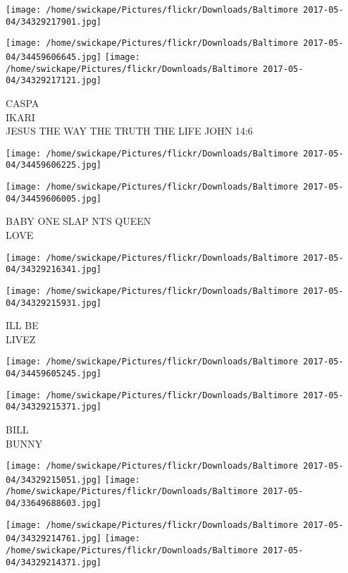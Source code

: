 \documentclass[10pt,letterpaper]{article}
\begin{document}
\texttt{[image: /home/swickape/Pictures/flickr/Downloads/Baltimore 2017-05-04/34329217901.jpg]}

\vspace{0.25in}
\texttt{[image: /home/swickape/Pictures/flickr/Downloads/Baltimore 2017-05-04/34459606645.jpg]}
\texttt{[image: /home/swickape/Pictures/flickr/Downloads/Baltimore 2017-05-04/34329217121.jpg]}

CASPA\\
IKARI\\
JESUS THE WAY THE TRUTH THE LIFE JOHN 14:6
\pagebreak

\texttt{[image: /home/swickape/Pictures/flickr/Downloads/Baltimore 2017-05-04/34459606225.jpg]}

\vspace{0.25in}
\texttt{[image: /home/swickape/Pictures/flickr/Downloads/Baltimore 2017-05-04/34459606005.jpg]}

BABY ONE SLAP NTS QUEEN\\
LOVE
\pagebreak

\texttt{[image: /home/swickape/Pictures/flickr/Downloads/Baltimore 2017-05-04/34329216341.jpg]}

\vspace{0.25in}
\texttt{[image: /home/swickape/Pictures/flickr/Downloads/Baltimore 2017-05-04/34329215931.jpg]}

ILL BE\\
LIVEZ
\pagebreak

\texttt{[image: /home/swickape/Pictures/flickr/Downloads/Baltimore 2017-05-04/34459605245.jpg]}

\vspace{0.25in}
\texttt{[image: /home/swickape/Pictures/flickr/Downloads/Baltimore 2017-05-04/34329215371.jpg]}

BILL\\
BUNNY
\pagebreak

\texttt{[image: /home/swickape/Pictures/flickr/Downloads/Baltimore 2017-05-04/34329215051.jpg]}
\texttt{[image: /home/swickape/Pictures/flickr/Downloads/Baltimore 2017-05-04/33649688603.jpg]}

\texttt{[image: /home/swickape/Pictures/flickr/Downloads/Baltimore 2017-05-04/34329214761.jpg]}
\texttt{[image: /home/swickape/Pictures/flickr/Downloads/Baltimore 2017-05-04/34329214371.jpg]}
\end{document}

